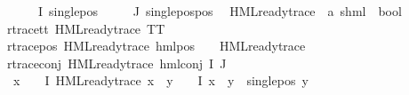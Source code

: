 \begin{isabellebody}
\ {\isachardoublequoteopen}{\isasymforall}{\isasymphi}\ {\isasymin}\ {\isacharparenleft}{\kern0pt}{\isasymPhi}\ {\isacharbackquote}{\kern0pt}\ I{\isacharparenright}{\kern0pt}{\isachardot}{\kern0pt}\ {\isacharparenleft}{\kern0pt}single{\isacharunderscore}{\kern0pt}pos\ {\isasymphi}{\isacharparenright}{\kern0pt}{\isachardoublequoteclose}\isanewline
{\isachardoublequoteopen}{\isasymforall}{\isasymphi}\ {\isasymin}\ {\isacharparenleft}{\kern0pt}{\isasymPhi}\ {\isacharbackquote}{\kern0pt}\ J{\isacharparenright}{\kern0pt}{\isachardot}{\kern0pt}\ single{\isacharunderscore}{\kern0pt}pos{\isacharunderscore}{\kern0pt}pos\ {\isasymphi}{\isachardoublequoteclose}\isanewline
\isanewline
\isanewline
{}\isamarkupfalse%
\ HML{\isacharunderscore}{\kern0pt}ready{\isacharunderscore}{\kern0pt}trace\ {\isacharcolon}{\kern0pt}{\isacharcolon}{\kern0pt}\ {\isachardoublequoteopen}{\isacharparenleft}{\kern0pt}{\isacharprime}{\kern0pt}a{\isacharcomma}{\kern0pt}\ {\isacharprime}{\kern0pt}s{\isacharparenright}{\kern0pt}hml\ {\isasymRightarrow}\ bool{\isachardoublequoteclose}\isanewline
\ \ \isanewline
r{\isacharunderscore}{\kern0pt}trace{\isacharunderscore}{\kern0pt}tt{\isacharcolon}{\kern0pt}\ {\isachardoublequoteopen}HML{\isacharunderscore}{\kern0pt}ready{\isacharunderscore}{\kern0pt}trace\ TT{\isachardoublequoteclose}\ {\isacharbar}{\kern0pt}\isanewline
r{\isacharunderscore}{\kern0pt}trace{\isacharunderscore}{\kern0pt}pos{\isacharcolon}{\kern0pt}\ {\isachardoublequoteopen}HML{\isacharunderscore}{\kern0pt}ready{\isacharunderscore}{\kern0pt}trace\ {\isacharparenleft}{\kern0pt}hml{\isacharunderscore}{\kern0pt}pos\ {\isasymalpha}\ {\isasymphi}{\isacharparenright}{\kern0pt}{\isachardoublequoteclose}\ \ {\isachardoublequoteopen}HML{\isacharunderscore}{\kern0pt}ready{\isacharunderscore}{\kern0pt}trace\ {\isasymphi}{\isachardoublequoteclose}{\isacharbar}{\kern0pt}\isanewline
r{\isacharunderscore}{\kern0pt}trace{\isacharunderscore}{\kern0pt}conj{\isacharcolon}{\kern0pt}\ {\isachardoublequoteopen}HML{\isacharunderscore}{\kern0pt}ready{\isacharunderscore}{\kern0pt}trace\ {\isacharparenleft}{\kern0pt}hml{\isacharunderscore}{\kern0pt}conj\ I\ J\ {\isasymPhi}{\isacharparenright}{\kern0pt}{\isachardoublequoteclose}\ \isanewline
{}\ {\isachardoublequoteopen}{\isacharparenleft}{\kern0pt}{\isasymexists}x\ {\isasymin}\ {\isacharparenleft}{\kern0pt}{\isasymPhi}\ {\isacharbackquote}{\kern0pt}\ I{\isacharparenright}{\kern0pt}{\isachardot}{\kern0pt}\ HML{\isacharunderscore}{\kern0pt}ready{\isacharunderscore}{\kern0pt}trace\ x\ {\isasymand}\ {\isacharparenleft}{\kern0pt}{\isasymforall}y\ {\isasymin}\ {\isacharparenleft}{\kern0pt}{\isasymPhi}\ {\isacharbackquote}{\kern0pt}\ I{\isacharparenright}{\kern0pt}{\isachardot}{\kern0pt}\ x\ {\isasymnoteq}\ y\ {\isasymlongrightarrow}\ single{\isacharunderscore}{\kern0pt}pos\ y{\isacharparenright}{\kern0pt}{\isacharparenright}{\kern0pt}\isanewline

\end{isabellebody}
